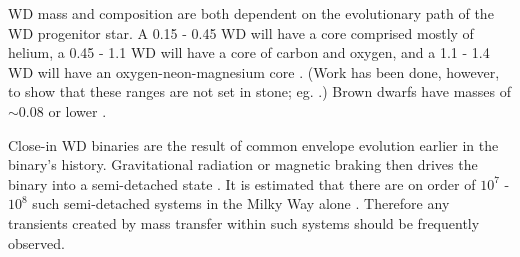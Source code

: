 WD mass and composition are both dependent on the evolutionary path of the WD progenitor star. A 0.15 - 0.45 {\Msun} WD will have a core comprised mostly of helium, a 0.45 - 1.1 {\Msun} WD will have a core of carbon and oxygen, and a 1.1 - 1.4 {\Msun} WD will have an oxygen-neon-magnesium core \citep{loreig09,mars11}.  (Work has been done, however, to show that these ranges are not set in stone; eg. \cite{moros09}.)  Brown dwarfs have masses of $\sim 0.08$ {\Msun} or lower \citep{stamw08}.


Close-in WD binaries are the result of common envelope evolution earlier in the binary's history.  Gravitational radiation or magnetic braking then drives the binary into a semi-detached state \citep{motl+07,nele+01}.  It is estimated that there are on order of $10^7$ - $10^8$ such semi-detached systems in the Milky Way alone \citep{motl+07,nele+01,mars11}.  Therefore any transients created by mass transfer within such systems should be frequently observed.

